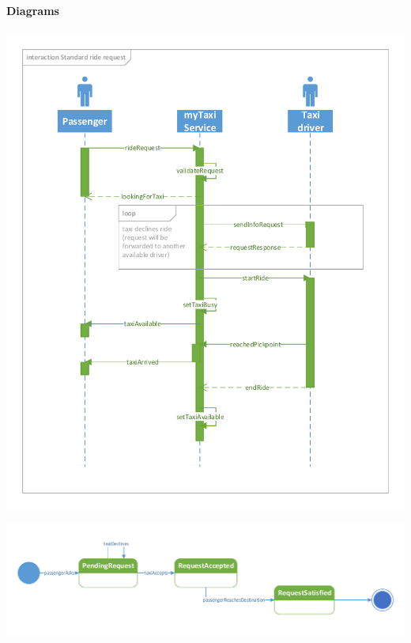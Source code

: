 	\paragraph{Diagrams}
		\begin{center}
	\includegraphics[width=\textwidth]{diagrams/standard_request}
\end{center}
\begin{center}
	\includegraphics[width=\textwidth]{diagrams/standard_state}
\end{center}
	

